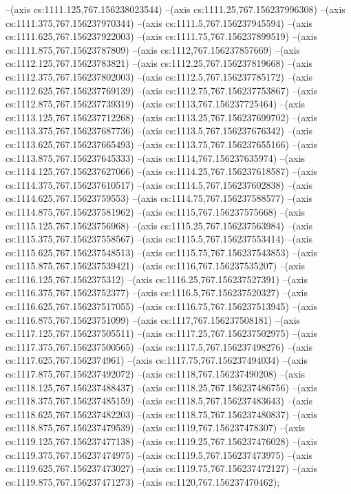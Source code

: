 --(axis cs:1111.125,767.156238023544)
--(axis cs:1111.25,767.156237996308)
--(axis cs:1111.375,767.156237970344)
--(axis cs:1111.5,767.156237945594)
--(axis cs:1111.625,767.156237922003)
--(axis cs:1111.75,767.156237899519)
--(axis cs:1111.875,767.15623787809)
--(axis cs:1112,767.156237857669)
--(axis cs:1112.125,767.15623783821)
--(axis cs:1112.25,767.156237819668)
--(axis cs:1112.375,767.156237802003)
--(axis cs:1112.5,767.156237785172)
--(axis cs:1112.625,767.156237769139)
--(axis cs:1112.75,767.156237753867)
--(axis cs:1112.875,767.156237739319)
--(axis cs:1113,767.156237725464)
--(axis cs:1113.125,767.156237712268)
--(axis cs:1113.25,767.156237699702)
--(axis cs:1113.375,767.156237687736)
--(axis cs:1113.5,767.156237676342)
--(axis cs:1113.625,767.156237665493)
--(axis cs:1113.75,767.156237655166)
--(axis cs:1113.875,767.156237645333)
--(axis cs:1114,767.156237635974)
--(axis cs:1114.125,767.156237627066)
--(axis cs:1114.25,767.156237618587)
--(axis cs:1114.375,767.156237610517)
--(axis cs:1114.5,767.156237602838)
--(axis cs:1114.625,767.15623759553)
--(axis cs:1114.75,767.156237588577)
--(axis cs:1114.875,767.156237581962)
--(axis cs:1115,767.156237575668)
--(axis cs:1115.125,767.15623756968)
--(axis cs:1115.25,767.156237563984)
--(axis cs:1115.375,767.156237558567)
--(axis cs:1115.5,767.156237553414)
--(axis cs:1115.625,767.156237548513)
--(axis cs:1115.75,767.156237543853)
--(axis cs:1115.875,767.156237539421)
--(axis cs:1116,767.156237535207)
--(axis cs:1116.125,767.1562375312)
--(axis cs:1116.25,767.156237527391)
--(axis cs:1116.375,767.15623752377)
--(axis cs:1116.5,767.156237520327)
--(axis cs:1116.625,767.156237517055)
--(axis cs:1116.75,767.156237513945)
--(axis cs:1116.875,767.15623751099)
--(axis cs:1117,767.156237508181)
--(axis cs:1117.125,767.156237505511)
--(axis cs:1117.25,767.156237502975)
--(axis cs:1117.375,767.156237500565)
--(axis cs:1117.5,767.156237498276)
--(axis cs:1117.625,767.1562374961)
--(axis cs:1117.75,767.156237494034)
--(axis cs:1117.875,767.156237492072)
--(axis cs:1118,767.156237490208)
--(axis cs:1118.125,767.156237488437)
--(axis cs:1118.25,767.156237486756)
--(axis cs:1118.375,767.156237485159)
--(axis cs:1118.5,767.156237483643)
--(axis cs:1118.625,767.156237482203)
--(axis cs:1118.75,767.156237480837)
--(axis cs:1118.875,767.156237479539)
--(axis cs:1119,767.156237478307)
--(axis cs:1119.125,767.156237477138)
--(axis cs:1119.25,767.156237476028)
--(axis cs:1119.375,767.156237474975)
--(axis cs:1119.5,767.156237473975)
--(axis cs:1119.625,767.156237473027)
--(axis cs:1119.75,767.156237472127)
--(axis cs:1119.875,767.156237471273)
--(axis cs:1120,767.156237470462);
